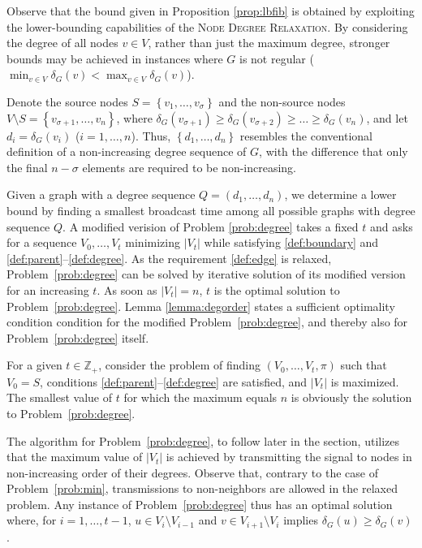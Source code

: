 Observe that the bound given in Proposition \ref{prop:lbfib} is obtained by exploiting the lower-bounding capabilities of the \textsc{Node Degree Relaxation}.
By considering the degree of all nodes $v\in V$, rather than just the maximum degree, stronger bounds may be achieved in instances where $G$ is not regular
($\min_{v\in V}\delta_G(v)<\max_{v\in V}\delta_G(v)$).

Denote the source nodes $S=\left\{v_1,\dots,v_{\sigma}\right\}$ and the non-source nodes $V\setminus S=\left\{v_{\sigma+1},\ldots,v_n\right\}$, where $\delta_G(v_{\sigma+1})\geq\delta_G(v_{\sigma+2})\geq\dots\geq\delta_G(v_n)$,
and let $d_i=\delta_G(v_i)$ ($i=1,\ldots,n$).
Thus, $\left\{d_1,\ldots,d_n\right\}$ resembles the conventional definition of a non-increasing degree sequence of $G$,
with the difference that only the final $n-\sigma$ elements are required to be non-increasing.

Given a graph with a degree sequence 
$Q=(d_1,\dots,d_n)$, we determine a lower bound by finding a smallest broadcast time among all possible graphs with degree sequence $Q$.
A modified verision of Problem \ref{prob:degree} takes a fixed $t$ and asks for a sequence $V_0,\dots,V_t$ minimizing $|V_t|$ while satisfying \ref{def:boundary} and \ref{def:parent}--\ref{def:degree}.
As the requirement \ref{def:edge} is relaxed, Problem~\ref{prob:degree} can be solved by iterative solution of its modified version for an increasing $t$.
As soon as $|V_t|=n$, $t$ is the optimal solution to Problem~\ref{prob:degree}.
Lemma \ref{lemma:degorder} states a sufficient optimality condition condition for the modified Problem~\ref{prob:degree}, and thereby also for Problem~\ref{prob:degree} itself.

For a given $t\in\mathbb{Z}_+$, consider the problem of finding $\left(V_0,\ldots,V_t,\pi\right)$ such that $V_0=S$,
conditions \ref{def:parent}--\ref{def:degree} are satisfied, and $\left|V_t\right|$ is maximized.
The smallest value of $t$ for which the maximum equals $n$ is obviously the solution to Problem~\ref{prob:degree}.

The algorithm for Problem~\ref{prob:degree}, to follow later in the section, utilizes that the maximum value of $\left|V_t\right|$
is achieved by transmitting the signal to nodes in non-increasing order of their degrees.
Observe that, contrary to the case of Problem~\ref{prob:min}, transmissions to non-neighbors are allowed in the relaxed problem.
Any instance of Problem~\ref{prob:degree} thus has an optimal solution where, for $i=1,\ldots,t-1$,
$u\in V_i\setminus V_{i-1}$ and $v\in V_{i+1}\setminus V_i$ implies $\delta_G(u)\geq\delta_G(v)$.

